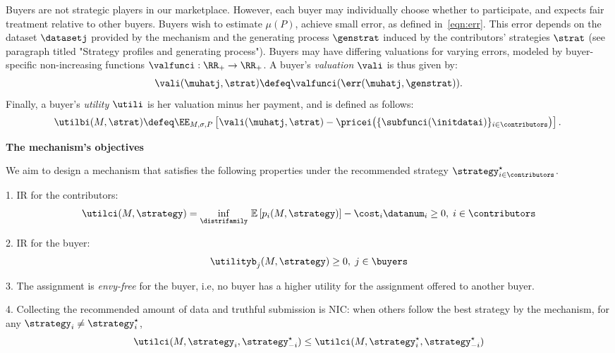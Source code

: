 Buyers are not strategic players in our marketplace.
However, each buyer may individually choose whether to participate, and expects fair treatment relative to other buyers.
Buyers wish to estimate $\mu(P)$, \ie achieve small error, as defined in~\eqref{eqn:err}.
This error depends on the dataset $\datasetj$ provided by the mechanism and the generating process $\genstrat$ induced by the contributors' strategies $\strat$ (see paragraph titled "Strategy profiles and generating process").
Buyers may have differing valuations for varying errors, modeled by buyer-specific non-increasing functions $\valfunci: \RR_+ \rightarrow \RR_+$.
A buyer's \emph{valuation} $\vali$ is thus given by:
\begin{align}
    \vali(\muhatj, \strat) \defeq \valfunci(\err(\muhatj, \genstrat)).
    \label{eqn:buyerval}
\end{align}
Finally, a buyer's \emph{utility} $\utili$ is her valuation minus her payment,
and is defined as follows:
\begin{align}
\hspace{-0.07in}
    \utilbi(M, \strat) \defeq \EE_{M, \sigma, P}\left[ \vali(\muhatj, \strat) - \pricei\big(\{\subfunci(\initdatai)\}_{i\in\contributors}\big) \right].
    \hspace{-0.03in}
    \label{eqn:buyerutil}
\end{align}

\textbf{The mechanism's objectives}

We aim to design a mechanism that satisfies the following properties under the recommended strategy $\strategy^{\star}_{i \in \contributors}$.



1. IR for the contributors: \[\utilci (M,\strategy) = \underset{\distrifamily}{\inf} \ \mathbb{E}\left[  p_i(M,\strategy)\right]-\cost_i \datanum_i \geq 0 , \; i \in \contributors \] 

2. IR for the buyer: \[\utilityb_j(M,\strategy  ) \geq 0 , \; j \in \buyers  \] 

3. The assignment is \emph{envy-free} for the buyer, i.e, no buyer has a higher utility for the assignment offered to another buyer.

4. Collecting the recommended amount of data and truthful submission is NIC: when others follow the best strategy by the mechanism, for any $\strategy_i \neq \strategy_i^{\star} $,
\[ \utilci (M,\strategy_i,\strategy_{-i}^{\star}) \leq \utilci (M,\strategy_i^{\star},\strategy_{-i}^{\star})  \]


